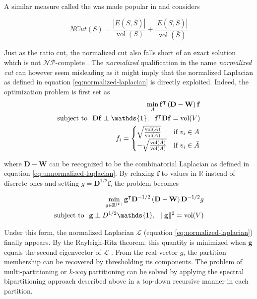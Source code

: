 \documentclass[12pt, oneside, extrafontsizes]{memoir}  %
\def\transpose{\intercal}
\def\laplacian{\mathbf{\mathcal{L}}}
\def\indicator{\mathds{1}}
\DeclareMathOperator{\vol}{\text{vol}}
\newcommand{\termidx}[1]{\index{#1}{\textbf{#1}}}
\theoremstyle{plain}
\theoremstyle{definition}
\begin{document}
A similar measure called the \termidx{normalized cut} was made popular in \cite{ShiMalik2000} and considers

\begin{equation}
NCut(S) = \frac{|E(S, \bar{S})|}{\vol(S)} + \frac{|E(S, \bar{S})|}{\vol(\bar{S})}
\label{eq:ncut}
\end{equation}

Just as the ratio cut, the normalized cut also falls short of an exact solution which is not
$\mathcal{NP}$-complete \cite{ShiMalik2000}. The \textit{normalized} qualification in
the name \textit{normalized cut} can however seem misleading as it might imply that
the normalized Laplacian as defined in equation \ref{eq:normalized-laplacian} is directly
exploited. Indeed, the optimization problem is first set \cite{Luxburg2007} as
\begin{align}
\min_A \mathbf{f}^\transpose \left( \mathbf{D} - \mathbf{W} \right) \mathbf{f} \\
\text{subject to} \hspace{2.5mm} \mathbf{D} \mathbf{f} \perp \indicator, \hspace{2.5mm}  \mathbf{f}^\transpose \mathbf{D} \mathbf{f} = \vol(V) \notag \\
f_i = \begin{cases}
\sqrt{\frac{\vol(A)}{\vol(\bar{A})}} & \text{if $v_i \in A$} \\
-\sqrt{\frac{\vol(\bar{A})}{\vol(A)}} & \text{if $v_i \in \bar{A}$} 
\end{cases} \notag
\end{align}

where $\mathbf{D} - \mathbf{W}$ can be recognized to be the combinatorial Laplacian
as defined in equation \ref{eq:unnormalized-laplacian}.  By relaxing $\mathbf{f}$ to 
values in $\mathbb{R}$ instead of discrete ones and setting $g = \mathbf{D}^{1/2}
\mathbf{f}$, the problem becomes

\begin{align}
\min_{g \in \mathbb{R}^{|V|}} \mathbf{g}^\transpose\mathbf{D}^{-1/2}\left( \mathbf{D} - \mathbf{W} \right) \mathbf{D}^{-1/2} g \\
\text{subject to} \hspace{2.5mm} \mathbf{g} \perp D^{1/2} \indicator, \hspace{2.5mm}  \| \mathbf{g} \|^2 = \vol(V) \notag \\
\end{align}

Under this form, the normalized Laplacian $\laplacian$ (equation 
\ref{eq:normalized-laplacian}) finally appears. By the Rayleigh-Ritz theorem, this
quantity is minimized when $\mathbf{g}$ equals the second eigenvector of $\laplacian$
\cite{Chung1997}. From the real vector $g$, the partition membership can be recovered
by thresholding its components. The problem of multi-partitioning or \textit{k-way} partitioning can be solved by applying the spectral bipartitioning approach described above in a top-down recursive manner in each partition.
\end{document}
